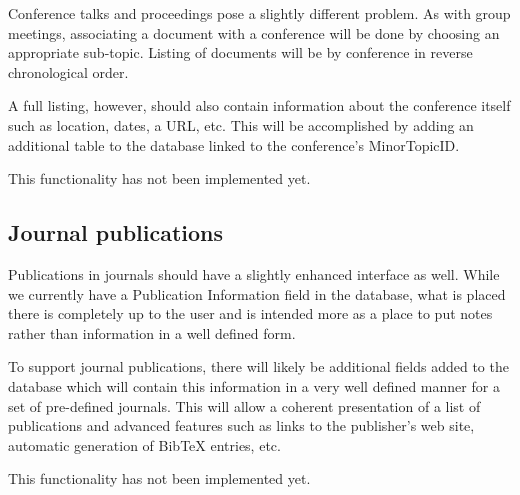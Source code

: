 \documentclass[12pt]{article}
\begin{document}
Conference talks and proceedings pose a slightly different problem. As with
group meetings, associating a document with a conference will be done by
choosing an appropriate sub-topic. Listing of documents will be by conference
in reverse chronological order. 

A full listing, however, should also contain information about the conference
itself such as location, dates, a URL, etc. This will be accomplished by adding
an additional table to the database linked to the conference's MinorTopicID.

This functionality has not been implemented yet.

\subsection{Journal publications}

Publications in journals should have a slightly enhanced interface as well.
While we currently have a Publication Information field in the database, what is
placed there is completely up to the user and is intended more as a place to put
notes rather than information in a well defined form. 

To support journal publications, there will likely be additional fields added to
the database which will contain this information in a very well defined manner
for a set of pre-defined journals. This will allow a coherent presentation of a
list of publications and advanced features such as links to the publisher's web
site, automatic generation of BibTeX entries, etc.

This functionality has not been implemented yet.


                                                                                      
\end{document}

